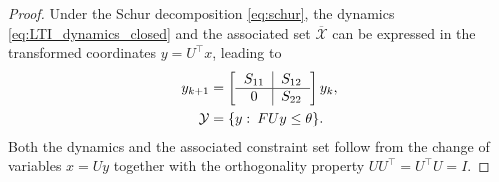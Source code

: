\documentclass[journal,twoside,web]{ieeecolor}
\begin{document}

\begin{proof}
Under the Schur decomposition \eqref{eq:schur}, the dynamics \eqref{eq:LTI_dynamics_closed} and the associated set $\overline{\mathcal X}$ can be expressed in the transformed coordinates $y = U^\top x$, leading to
\begin{subequations}
\begin{align}
    \label{eq:y_dynamics}
    y_{k+1}&=\left[\begin{tabular}{c|c}
         $S_{11}$& $S_{12}$ \\\hline
         0& $S_{22}$
    \end{tabular}\right]y_k, \\
    \label{eq:y_set}\mathcal Y &= \{y:\: FUy\leq \theta\}.
\end{align}
\end{subequations}
Both the dynamics and the associated constraint set follow from the change of variables $x = Uy$ together with the orthogonality property $UU^\top = U^\top U = I$.


\end{proof}
\end{document}

